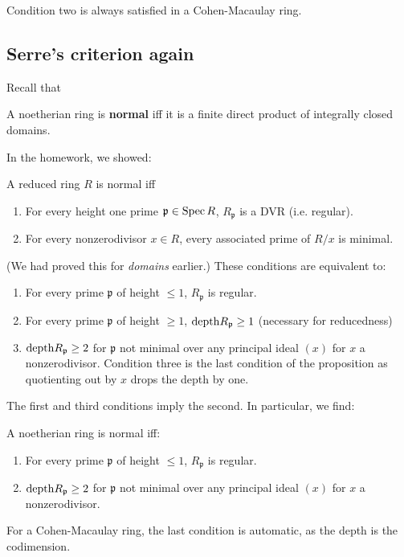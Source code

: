 Condition two is always satisfied in a Cohen-Macaulay ring.

\subsection{Serre's criterion again}

Recall that
\begin{definition}
A noetherian ring is \textbf{normal} iff it is a finite direct
product of
integrally closed domains.
\end{definition}

In the homework, we showed:
\begin{proposition}
A reduced ring $R$ is normal iff
\begin{enumerate}
\item For every height one prime $\mathfrak{p}  \in \operatorname{Spec} R$,
$R_{\mathfrak{p}}$ is a DVR (i.e. regular).
\item For every nonzerodivisor $x \in R$, every associated prime
of $R/x$ is
minimal.
\end{enumerate}
\end{proposition}
(We had proved this for \emph{domains} earlier.)
These conditions are equivalent to:
\begin{enumerate}
\item For every prime $\mathfrak{p}$ of height $\leq 1$,
$R_{\mathfrak{p}} $ is regular.
\item For every prime $\mathfrak{p}$ of height $\geq 1$,
$\mathrm{depth} R_{\mathfrak{p}} \geq 1$ (necessary for reducedness)
\item $\mathrm{depth} R_{\mathfrak{p}} \geq 2$ for $\mathfrak{p}$ not
minimal over any
principal ideal $(x)$ for $x$ a nonzerodivisor. Condition three
is the last
condition of the proposition as quotienting out by $x$ drops the
depth by one.
\end{enumerate}

The first and third conditions imply the second. In particular,
we find:

\begin{theorem} A noetherian ring is normal
iff:
\begin{enumerate}
\item For every prime $\mathfrak{p}$ of height $\leq 1$,
$R_{\mathfrak{p}} $ is regular.
\item $\mathrm{depth} R_{\mathfrak{p}} \geq 2$ for $\mathfrak{p}$ not
minimal over any
principal ideal $(x)$ for $x$ a nonzerodivisor. \end{enumerate}
\end{theorem}
For a Cohen-Macaulay ring, the last condition is automatic, as
the depth is the
codimension.

